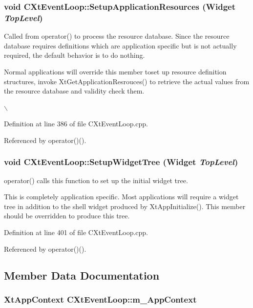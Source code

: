 \subsubsection{\setlength{\rightskip}{0pt plus 5cm}void CXt\-Event\-Loop::Setup\-Application\-Resources (Widget {\em Top\-Level})\hspace{0.3cm}{\tt  [protected, virtual]}}\label{classCXtEventLoop_b7}


Called from operator() to process the resource database. Since the resource database requires definitions which are application specific but is not actually  required, the default behavior is to do nothing.

Normal applications will override this member toset  up resource definition structures, invoke Xt\-Get\-Application\-Resrouces() to retrieve the actual values from the resource database and validity check them.

$\backslash$ 

Definition at line 386 of file CXt\-Event\-Loop.cpp.

Referenced by operator()().
\subsubsection{\setlength{\rightskip}{0pt plus 5cm}void CXt\-Event\-Loop::Setup\-Widget\-Tree (Widget {\em Top\-Level})\hspace{0.3cm}{\tt  [protected, virtual]}}\label{classCXtEventLoop_b8}


operator() calls this function to set up the initial widget tree.

This is completely application specific. Most applications will require a widget tree in addition to the shell widget produced by Xt\-App\-Initialize(). This member should be overridden to produce this tree. 

Definition at line 401 of file CXt\-Event\-Loop.cpp.

Referenced by operator()().

\subsection{Member Data Documentation}
\subsubsection{\setlength{\rightskip}{0pt plus 5cm}Xt\-App\-Context CXt\-Event\-Loop::m\_\-App\-Context\hspace{0.3cm}{\tt  [private]}}\label{classCXtEventLoop_o1}


